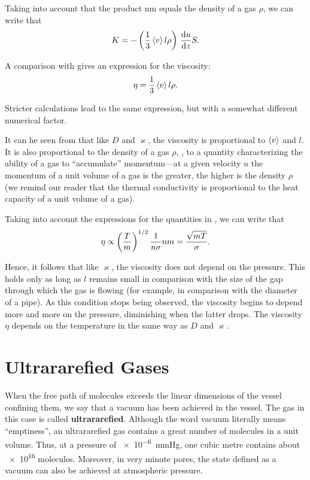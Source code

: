 Taking into account that the product nm equals the density of a gas $\rho$, we can write that
\begin{equation*}
    K = -\left(\frac{1}{3} \left\langle v \right\rangle l \rho\right)\,\frac{\mathrm{d} u}{\mathrm{d} z} S.
\end{equation*}

\noindent
A comparison with  gives an expression for the viscosity:
\begin{equation}\label{eq:16_30}
    \eta = \frac{1}{3} \left\langle v \right\rangle l \rho.
\end{equation}

\noindent
Stricter calculations lead to the same expression, but with a somewhat different numerical factor.

It can he seen from  that like $D$ and $\varkappa$, the viscosity is proportional to $\left\langle v \right\rangle$ and $l$. It is also proportional to the density of a gas $\rho$, \ie, to a quantity characterizing the ability of a gas to ``accumulate'' momentum---at a given velocity $u$ the momentum of a unit volume of a gas is the greater, the higher is the density $\rho$ (we remind our reader that the thermal conductivity is proportional to the heat capacity of a unit volume of a gas).

Taking into account the expressions for the quantities in , we can write that
\begin{equation*}
    \eta \propto \left(\frac{T}{m}\right)^{1/2} \frac{1}{n\sigma} n m = \frac{\sqrt{mT}}{\sigma}.
\end{equation*}

\noindent
Hence, it follows that like $\varkappa$, the viscosity does not depend on the pressure. This holds only as long as $l$ remains small in comparison with the size of the gap through which the gas is flowing (for example, in comparison with the diameter of a pipe). As this condition stops being observed, the viscosity begins to depend more and more on the pressure, diminishing when the latter drops. The viscosity $\eta$ depends on the temperature in the same way as $D$ and $\varkappa$.

\section{Ultrararefied Gases}\label{sec:16_6}

When the free path of molecules exceeds the linear dimensions of the vessel confining them, we say that a vacuum has been achieved in the vessel. The gas in this case is called \textbf{ultrararefied}. Although the word vacuum literally means ``emptiness'', an ultrararefied gas contains a great number of molecules in a unit volume. Thus, at a pressure of \SI{e-6}{\mmHg}, one cubic metre contains about \num{e16} molecules. Moreover, in very minute pores, the state defined as a vacuum can also be achieved at atmospheric pressure.

